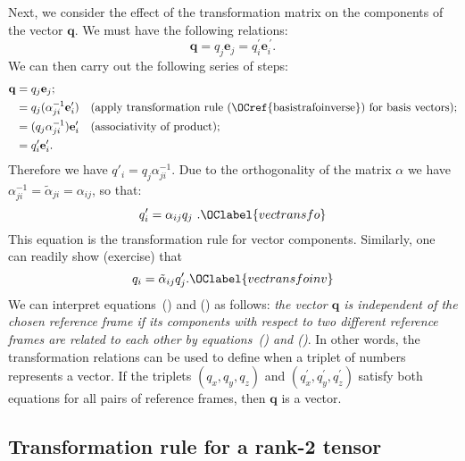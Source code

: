 Next, we consider the effect of the transformation matrix on the components of the vector $\mathbf{q}$.  We must have the following relations:
\begin{equation}
	\mathbf{q}=q_j\mathbf{e}_j=q_i^{\prime}\mathbf{e}_i^{\,\prime}.
\end{equation}
We can then carry out the following series of steps:
\begin{align*}
	\mathbf{q} &= q_j\mathbf{e}_j;\\
	&= q_j (\alpha^{-1}_{ji}\mathbf{e}'_i)\quad\text{(apply transformation rule (\OCref{basistrafoinverse}) for basis vectors)};\\
	&= (q_j \alpha^{-1}_{ji})\mathbf{e}'_i\quad\text{(associativity of product)};\\
	&= q'_i\mathbf{e}'_i.
\end{align*}
Therefore we have $q'_i= q_j \alpha^{-1}_{ji}$. Due to the orthogonality of the matrix $\alpha$ we have $\alpha^{-1}_{ji}=\tilde{\alpha}_{ji}=\alpha_{ij}$, so that:
\begin{equation}
	q'_i = \alpha_{ij}q_j\ .\OClabel{vectransfo}
\end{equation}
This equation is the transformation rule for vector components.  Similarly, one can readily show (exercise) that
\begin{equation}
	q_i=\tilde{\alpha}_{ij}q_j^{\prime}.\OClabel{vectransfoinv}
\end{equation}
We can interpret equations~() and () as follows: \textit{the vector $\mathbf{q}$ is independent of the chosen reference frame if its components with respect to two different reference frames are related to each other by equations~() and ()}.  In other words, the transformation relations can be used to define when a triplet of numbers represents a vector.  If the triplets $(q_x,q_y,q_z)$ and $(q_x^{\prime},q_y^{\prime},q_z^{\prime})$ satisfy both equations for all pairs of reference frames, then $\mathbf{q}$ is a vector.  


\subsection{Transformation rule for a rank-2 tensor}

